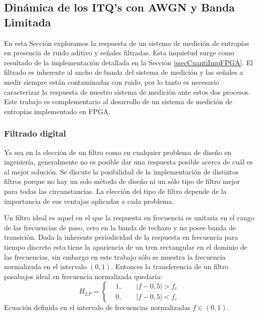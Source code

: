\subsection{Dinámica de los ITQ's con AWGN y Banda Limitada}
\label{ssec:TDdS}
	
En esta Sección exploramos la respuesta de un sistema de medición de entropías en presencia de ruido aditivo y señales filtradas.
Esta inquietud surge como resultado de la implementación detallada en la Sección \ref{ssecCuantiImpFPGA}.
El filtrado es inherente al ancho de banda del sistema de medición y las señales a medir siempre están contaminadas con ruido, por lo tanto es necesario caracterizar la respuesta de nuestro sistema de medición ante estos dos procesos.
Este trabajo es complementario al desarrollo de un sistema de medición de entropías implementado en FPGA.

\subsubsection{Filtrado digital}
\label{sec:filtrado}

Ya sea en la elección de un filtro como en cualquier problema de diseño en ingeniería, generalmente no es posible dar una respuesta posible acerca de cuál es al mejor solución. Se discute la posibilidad de la implementación de distintos filtros porque no hay un solo método de diseño ni un sólo tipo de filtro mejor para todas las circunstancias. La elección del tipo de filtro depende de la importancia de sus ventajas aplicadas a cada problema.

Un filtro ideal es aquel en el que la respuesta en frecuencia es unitaria en el rango de las frecuencias de paso, cero en la banda de rechazo y no posee banda de transición. Dada la inherente periodicidad de la respuesta en frecuencia para tiempo discreto esta tiene la apariencia de un tren rectangular en el dominio de las frecuencias, sin embargo en este trabajo sólo se muestra la frecuencia normalizada en el intervalo $(0,1)$. Entonces la transferencia de un filtro pasabajos ideal en frecuencia normalizada quedaría:
\begin{equation}
H_{LP}=
\left\{ 
\begin{aligned}
&1,\qquad|f-0,5|>f_c\\
&0,\qquad|f-0,5|<f_c
\end{aligned}
\right.
\end{equation}
Ecuación definida en el intervalo de frecuencias normalizadas $f\in\left(0,1\right)$.

